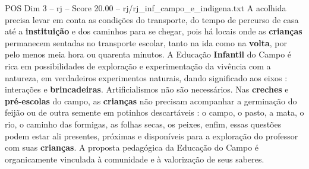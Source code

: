 \begin{textsample}{POS Dim 3 – rj – Score 20.00 – rj/rj\_inf\_campo\_e\_indigena.txt}
A acolhida precisa levar em conta as condições do transporte, do tempo de percurso de casa até a \textbf{instituição} e dos caminhos para se chegar, pois há locais onde as \textbf{crianças} permanecem sentadas no transporte escolar, tanto na ida como na \textbf{volta}, por pelo menos meia hora ou quarenta minutos.
A Educação \textbf{Infantil} do Campo é rica em possibilidades de exploração e experimentação da vivência com a natureza, em verdadeiros experimentos naturais, dando significado aos eixos : interações e \textbf{brincadeiras}.
Artificialismos não são necessários.
Nas \textbf{creches} e \textbf{pré-escolas} do campo, as \textbf{crianças} não precisam acompanhar a germinação do feijão ou de outra semente em potinhos descartáveis : o campo, o pasto, a mata, o rio, o caminho das formigas, as folhas secas, os peixes, enfim, essas questões podem estar ali presentes, próximas e disponíveis para a exploração do professor com suas \textbf{crianças}.
A proposta pedagógica da Educação do Campo é organicamente vinculada à comunidade e à valorização de seus saberes.

\end{textsample}

